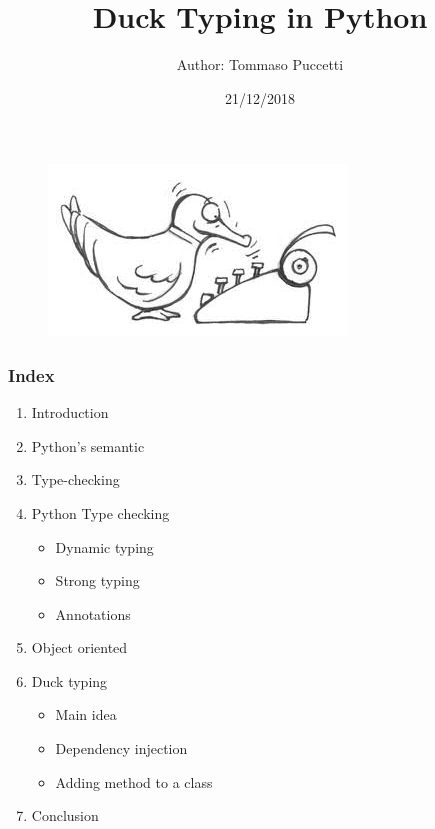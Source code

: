 \documentclass[xcolor ={table,usenames,dvipsnames}]{beamer}
\title{Duck Typing in Python}
\author{Author: Tommaso Puccetti}
\institute{Universit\`a  degli Studi di Firenze}
\date{21/12/2018}
\theoremstyle{definition}
\begin{document}
	
	\begin{frame}
		\maketitle
			\begin{figure}[h!]
			\centering
			\includegraphics[scale=2]{img/cartoonduck.jpg}
			\label{Interfacce di un CS}
		\end{figure}
	\end{frame}

	\begin{frame}
		\frametitle{Index}
		\begin{enumerate}
			\item Introduction
			\item Python's semantic
			\item Type-checking
			\item Python Type checking
			 \begin{itemize}
					\item Dynamic typing
					\item Strong typing
					\item Annotations
				  \end{itemize}
			\item Object oriented
			\item Duck typing
				  \begin{itemize}
				  	\item Main idea
				  	\item Dependency injection
				  	\item Adding method to a class
				  \end{itemize}
			\item Conclusion
		\end{enumerate}
	\end{frame}
\end{document}
